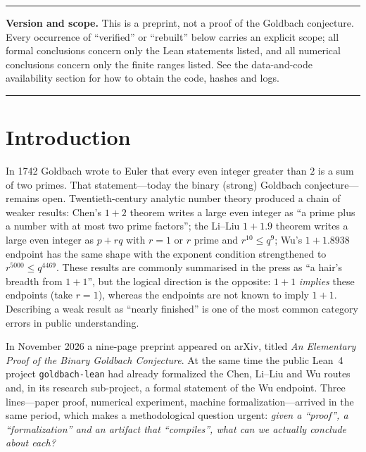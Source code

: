 \documentclass[11pt,a4paper]{article}
\theoremstyle{plain}
\theoremstyle{definition}
\begin{document}
\vspace{0.4em}
\noindent\rule{\textwidth}{0.4pt}
\begin{flushleft}
\small
\textbf{Version and scope.} This is a preprint, not a proof of the Goldbach conjecture. Every occurrence of ``verified'' or ``rebuilt'' below carries an explicit scope; all formal conclusions concern only the Lean statements listed, and all numerical conclusions concern only the finite ranges listed. See the data-and-code availability section for how to obtain the code, hashes and logs.
\end{flushleft}
\noindent\rule{\textwidth}{0.4pt}

\newpage
\section{Introduction}
\label{sec:intro}

In 1742 Goldbach wrote to Euler that every even integer greater than $2$ is a sum of two primes. That statement---today the binary (strong) Goldbach conjecture---remains open. Twentieth-century analytic number theory produced a chain of weaker results: Chen's $1+2$ theorem writes a large even integer as ``a prime plus a number with at most two prime factors''\cite{chen1973,chen1978}; the Li--Liu $1+1.9$ theorem writes a large even integer as $p+rq$ with $r=1$ or $r$ prime and $r^{10}\le q^{9}$\cite{liliu}; Wu's $1+1.8938$ endpoint has the same shape with the exponent condition strengthened to $r^{5000}\le q^{4469}$\cite{upstream}. These results are commonly summarised in the press as ``a hair's breadth from $1+1$'', but the logical direction is the opposite: $1+1$ \emph{implies} these endpoints (take $r=1$), whereas the endpoints are not known to imply $1+1$. Describing a weak result as ``nearly finished'' is one of the most common category errors in public understanding.

In November 2026 a nine-page preprint appeared on arXiv, titled \emph{An Elementary Proof of the Binary Goldbach Conjecture}\cite{qazaqzeh}. At the same time the public Lean~4 project \texttt{goldbach-lean} had already formalized the Chen, Li--Liu and Wu routes and, in its research sub-project, a formal statement of the Wu endpoint\cite{upstream}. Three lines---paper proof, numerical experiment, machine formalization---arrived in the same period, which makes a methodological question urgent: \emph{given a ``proof'', a ``formalization'' and an artifact that ``compiles'', what can we actually conclude about each?}
\end{document}
